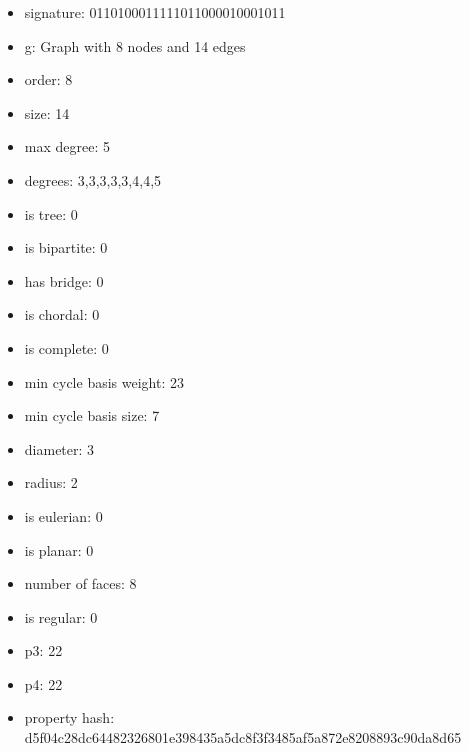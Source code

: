 \begin{itemize}
\item signature: 0110100011111011000010001011
\item g: Graph with 8 nodes and 14 edges
\item order: 8
\item size: 14
\item max degree: 5
\item degrees: 3,3,3,3,3,4,4,5
\item is tree: 0
\item is bipartite: 0
\item has bridge: 0
\item is chordal: 0
\item is complete: 0
\item min cycle basis weight: 23
\item min cycle basis size: 7
\item diameter: 3
\item radius: 2
\item is eulerian: 0
\item is planar: 0
\item number of faces: 8
\item is regular: 0
\item p3: 22
\item p4: 22
\item property hash: d5f04c28dc64482326801e398435a5dc8f3f3485af5a872e8208893c90da8d65
\end{itemize}
\newpage
\begin{figure}
\end{figure}
